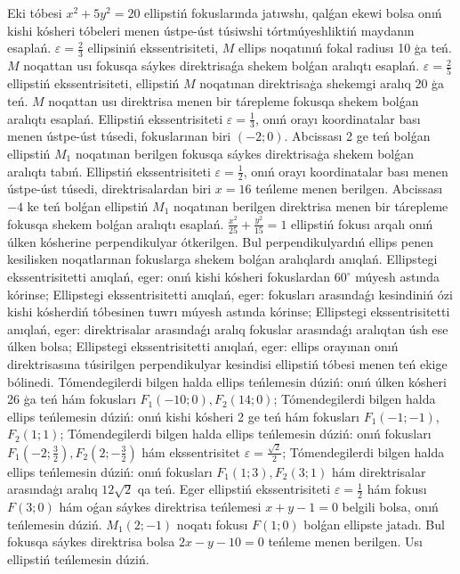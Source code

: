 Eki tóbesi $x^2+5 y^2=20$ ellipstiń fokuslarında jatıwshı, qalǵan ekewi bolsa onıń kishi kósheri tóbeleri menen ústpe-úst túsiwshi tórtmúyeshliktiń maydanın esaplań.
$\varepsilon=\frac{2}{3}$ ellipsiniń ekssentrisiteti, $M$ ellips noqatınıń fokal radiusı 10 ģa teń. $M$ noqattan usı fokusqa sáykes direktrisaǵa shekem bolǵan aralıqtı esaplań.
$\varepsilon=\frac{2}{5}$ ellipstiń ekssentrisiteti, ellipstiń $M$ noqatınan direktrisaģa shekemgi aralıq 20 ģa teń. $M$ noqattan usı direktrisa menen bir tárepleme fokusqa shekem bolǵan aralıqtı esaplań.
Ellipstiń ekssentrisiteti $\varepsilon=\frac{1}{3}$, onıń orayı koordinatalar bası menen ústpe-úst túsedi, fokuslarınan biri $ (-2; 0) $. Abcissası 2 ge teń bolǵan ellipstiń $M_1$ noqatınan berilgen fokusqa sáykes direktrisaģa shekem bolǵan aralıqtı tabıń.
Ellipstiń ekssentrisiteti $\varepsilon=\frac{1}{2}$, onıń orayı koordinatalar bası menen ústpe-úst túsedi, direktrisalardan biri $x=16$ teńleme menen berilgen. Abcissası $-4$ ke teń bolǵan ellipstiń $M_1$ noqatınan berilgen direktrisa menen bir tárepleme fokusqa shekem bolǵan aralıqtı esaplań.
$\frac{x^2}{25}+\frac{y^2}{15}=1$ ellipstiń fokusı arqalı onıń úlken kósherine perpendikulyar ótkerilgen. Bul perpendikulyardıń ellips penen kesilisken noqatlarınan fokuslarga shekem bolǵan aralıqlardı anıqlań.
Ellipstegi ekssentrisitetti anıqlań, eger: onıń kishi kósheri fokuslardan $60^{\circ}$ múyesh astında kórinse;
Ellipstegi ekssentrisitetti anıqlań, eger: fokusları arasındaǵı kesindiniń ózi kishi kósherdiń tóbesinen tuwrı múyesh astında kórinse;
Ellipstegi ekssentrisitetti anıqlań, eger: direktrisalar arasındaǵı aralıq fokuslar arasındaǵı aralıqtan úsh ese úlken bolsa;
Ellipstegi ekssentrisitetti anıqlań, eger: ellips orayınan onıń direktrisasına túsirilgen perpendikulyar kesindisi ellipstiń tóbesi menen teń ekige bólinedi.
Tómendegilerdi bilgen halda ellips teńlemesin dúziń: onıń úlken kósheri 26 ģa teń hám fokusları $F_1 (-10; 0), F_2 (14; 0) $;
Tómendegilerdi bilgen halda ellips teńlemesin dúziń: onıń kishi kósheri 2 ge teń hám fokusları $F_1 (-1;-1) $, $F_2 (1; 1) $;
Tómendegilerdi bilgen halda ellips teńlemesin dúziń: onıń fokusları $F_1\left(-2; \frac{3}{2}\right), F_2\left(2;-\frac{3}{2}\right) $ hám ekssentrisitet $\varepsilon=\frac{\sqrt{2}}{2}$;
Tómendegilerdi bilgen halda ellips teńlemesin dúziń: onıń fokusları $F_1 (1; 3), F_2 (3; 1) $ hám direktrisalar arasındaģı aralıq $12 \sqrt{2}$ qa teń.
Eger ellipstiń ekssentrisiteti $\varepsilon=\frac{1}{2}$ hám fokusı $F (3; 0) $ hám oǵan sáykes direktrisa teńlemesi $x+y-1=0$ belgili bolsa, onıń teńlemesin dúziń.
$M_1 (2;-1) $ noqatı fokusı $F (1;0) $ bolǵan ellipste jatadı. Bul fokusqa sáykes direktrisa bolsa $2x-y-10=0$ teńleme menen berilgen. Usı ellipstiń teńlemesin dúziń.
